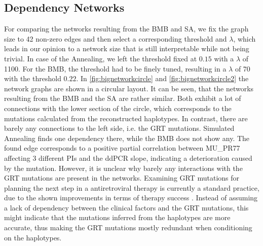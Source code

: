\subsection{Dependency Networks}
For comparing the networks resulting from the BMB and SA, we fix the graph size to 42 non-zero edges and then select a corresponding threshold and $\lambda$, which leads in our opinion to a network size that is still interpretable while not being trivial.
In case of the Annealing, we left the threshold fixed at $0.15$ with a $\lambda$ of 1100.
For the BMB, the threshold had to be finely tuned, resulting in a $\lambda$ of 70 with the threshold $0.22$.
In \autoref{fig:bignetworkcircle} and \autoref{fig:bignetworkcircle2} the network graphs are shown in a circular layout.
It can be seen, that the networks resulting from the BMB and the SA are rather similar.
Both exhibit a lot of connections with the lower section of the circle, which corresponds to the mutations calculated from the reconstructed haplotypes.
In contrast, there are barely any connections to the left side, i.e. the GRT mutations.
Simulated Annealing finds one dependency there, while the BMB does not show any.
The found edge corresponds to a positive partial correlation between MU\_PR77 affecting 3 different \gls{PI}s and the ddPCR slope, indicating a deterioration caused by the mutation.
However, it is unclear why barely any interactions with the GRT mutations are present in the networks.
Examining GRT mutations for planning the next step in a antiretroviral therapy is currently a standard practice, due to the shown improvements in terms of therapy success \cite{gunthard2018human}.
Instead of assuming a lack of dependency between the clinical factors and the GRT mutations, this might indicate that the mutations inferred from the haplotypes are more accurate,
thus making the GRT mutations mostly redundant when conditioning on the haplotypes.

